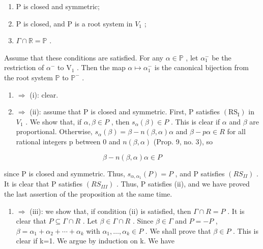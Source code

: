\begin{enumerate}
\def\labelenumi{(\roman{enumi})}
\item
  P is closed and symmetric;
\item
  P is closed, and P is a root system in \(V_{1}\) ;
\item
  \(\Gamma \cap \mathbb{R} = \mathbb{P}\) .
\end{enumerate}

Assume that these conditions are satisfied. For any \(\alpha \in \mathbb{P}\) , let \(\alpha_{1}^{-}\) be the restriction of \(\alpha^{-}\) to \(\mathrm{V}_{1}\) . Then the map \(\alpha \mapsto \alpha_{1}^{-}\) is the canonical bijection from the root system \(\mathbb{P}\) to \(\mathbb{P}^{-}\) .

\begin{enumerate}
\def\labelenumi{(\roman{enumi})}
\setcounter{enumi}{2}
\item
  \(\Longrightarrow\) (i): clear.
\item
  \(\Longrightarrow\) (ii): assume that P is closed and symmetric. First, P satisfies \((\mathrm{RS}_{\mathrm{I}})\) in \(V_{1}\) . We show that, if \(\alpha, \beta \in P\) , then \(s_{\alpha}(\beta) \in P\) . This is clear if \(\alpha\) and \(\beta\) are proportional. Otherwise, \(s_{\alpha}(\beta) = \beta - n(\beta, \alpha)\alpha\) and \(\beta - p\alpha \in R\) for all rational integers p between 0 and \(n(\beta, \alpha)\) (Prop. 9, no. 3), so
\end{enumerate}

\[
\beta - n (\beta , \alpha) \alpha \in P
\]

since P is closed and symmetric. Thus, \(s_{\alpha,\alpha_{1}}(P) = P\) , and P satisfies \((RS_{II})\) . It is clear that P satisfies \((RS_{III})\) . Thus, P satisfies (ii), and we have proved the last assertion of the proposition at the same time.

\begin{enumerate}
\def\labelenumi{(\roman{enumi})}
\setcounter{enumi}{1}
\tightlist
\item
  \(\Longrightarrow\) (iii): we show that, if condition (ii) is satisfied, then \(\Gamma\cap R=P\) . It is clear that \(P\subseteq\Gamma\cap R\) . Let \(\beta\in\Gamma\cap R\) . Since \(\beta\in\Gamma\) and \(P=-P\) , \(\beta=\alpha_{1}+\alpha_{2}+\cdots+\alpha_{k}\) with \(\alpha_{1},\ldots,\alpha_{k}\in P\) . We shall prove that \(\beta\in P\) . This is clear if k=1. We argue by induction on k. We have
\end{enumerate}

